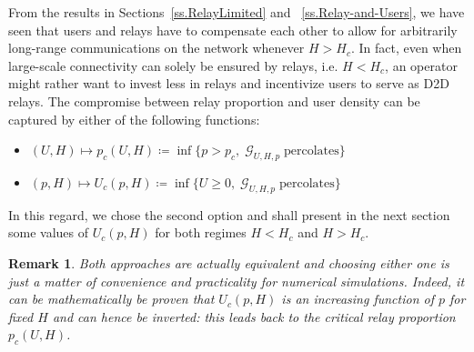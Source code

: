 \documentclass[conference]{IEEEtran}
\newtheorem{remark}{Remark}
\begin{document}
\vspace{1\baselineskip}
From the results in Sections~\ref{ss.RelayLimited} and ~\ref{ss.Relay-and-Users}, we have seen that users and relays have to compensate each other to allow for arbitrarily long-range communications on the network whenever $H>H_c$. In fact, even when large-scale connectivity can solely be ensured by relays, i.e. $H<H_c$, an operator might rather want to invest less in relays and incentivize users to serve as D2D relays. The compromise between relay proportion and user density can be captured by either of the following functions:
\begin{itemize}
    \item $(U,H) \mapsto p_c(U,H) \coloneqq \inf \lbrace p>p_c, \; \mathcal{G}_{U,H,p} \; \text{percolates} \rbrace$
    \item $(p,H) \mapsto U_c(p,H) \coloneqq \inf \lbrace U \geq 0, \; \mathcal{G}_{U,H,p} \; \text{percolates} \rbrace$
\end{itemize}
In this regard, we chose the second option and shall present in the next section some values of $U_c(p,H)$ for both regimes $H<H_c$ and $H>H_c$.
\begin{remark}
\label{remark-inverse-Uc(p,H)}
Both approaches are actually equivalent and choosing either one is just a matter of convenience and practicality for numerical simulations. Indeed, it can be mathematically be proven that $U_c(p,H)$ is an increasing function of $p$ for fixed $H$ and can hence be inverted: this leads back to the critical relay proportion $p_c(U,H)$.
\end{remark}
\end{document}
